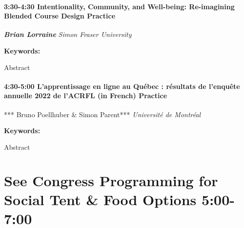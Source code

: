 \documentclass[
]{book}
\begin{document}
\begin{session}
\hypertarget{intentionality-community-and-well-being-re-imagining-blended-course-design-practice}{%
\paragraph*{\texorpdfstring{3:30-4:30 \textbar{} \textbf{Intentionality,
Community, and Well-being: Re-imagining Blended Course Design}
\textbar{}
Practice}{3:30-4:30 \textbar{} Intentionality, Community, and Well-being: Re-imagining Blended Course Design \textbar{} Practice}}\label{intentionality-community-and-well-being-re-imagining-blended-course-design-practice}}

\textbf{\emph{Brian Lorraine}} \textbar{} \emph{Simon Fraser University}

\textbf{Keywords:}

Abstract
\end{session}

\begin{session}
\hypertarget{lapprentissage-en-ligne-au-quuxe9bec-ruxe9sultats-de-lenquuxeate-annuelle-2022-de-lacrfl-in-french-practice}{%
\paragraph*{\texorpdfstring{4:30-5:00 \textbar{} \textbf{L'apprentissage
en ligne au Québec : résultats de l'enquête annuelle 2022 de l'ACRFL (in
French)} \textbar{}
Practice}{4:30-5:00 \textbar{} L'apprentissage en ligne au Québec : résultats de l'enquête annuelle 2022 de l'ACRFL (in French) \textbar{} Practice}}\label{lapprentissage-en-ligne-au-quuxe9bec-ruxe9sultats-de-lenquuxeate-annuelle-2022-de-lacrfl-in-french-practice}}

*** Bruno Poellhuber \& Simon Parent*** \textbar{} \emph{Université de
Montréal}

\textbf{Keywords:}

Abstract
\end{session}

\hypertarget{see-congress-programming-for-social-tent-food-options-500-700}{%
\section*{See Congress Programming for Social Tent \& Food Options \textbar{} 5:00-7:00}\label{see-congress-programming-for-social-tent-food-options-500-700}}
\end{document}
